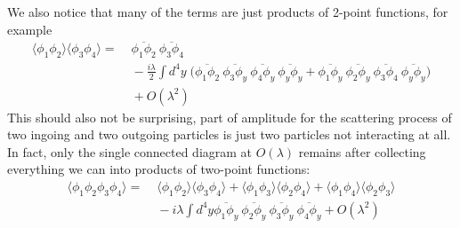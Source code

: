 We also notice that many of the terms are just products of 2-point
functions, for example
\begin{equation}
  \begin{split}
    \langle \phi_1 \phi_2 \rangle  \langle \phi_3 \phi_4 \rangle 
    =&\;
    \overline{\phi_1\phi_2}~
    \overline{\phi_3\phi_4}
    \\ &\;
    - \frac{i\lambda}{2} \int d^4y\;
    \Big(
    \overline{\phi_1 \phi_2}~
    \overline{\phi_3 \phi_y}~
    \overline{\phi_4 \phi_y}~
    \overline{\phi_y \phi_y} 
    +
    \overline{\phi_1 \phi_y}~
    \overline{\phi_2 \phi_y}~
    \overline{\phi_3 \phi_4}~
    \overline{\phi_y \phi_y} 
    \Big)
    \\ &\;
    + O(\lambda^2)
 \end{split}
\end{equation}
This should also not be surprising, part of amplitude for the
scattering process of two ingoing and two outgoing particles is just
two particles not interacting at all. In fact, only the single
connected diagram at $O(\lambda)$ remains after collecting everything
we can into products of two-point functions:
\begin{equation}
  \begin{split}
    \langle \phi_1 \phi_2\phi_3 \phi_4 \rangle 
    =&\;
    \langle \phi_1 \phi_2 \rangle
    \langle \phi_3 \phi_4 \rangle +
    \langle \phi_1 \phi_3 \rangle
    \langle \phi_2 \phi_4 \rangle +
    \langle \phi_1 \phi_4 \rangle
    \langle \phi_2 \phi_3 \rangle
    \\ &\;
    - i \lambda \int d^4y
    \overline{\phi_1 \phi_y}~
    \overline{\phi_2 \phi_y}~
    \overline{\phi_3 \phi_y}~
    \overline{\phi_4 \phi_y} 
    + O(\lambda^2)
  \end{split}
\end{equation}

